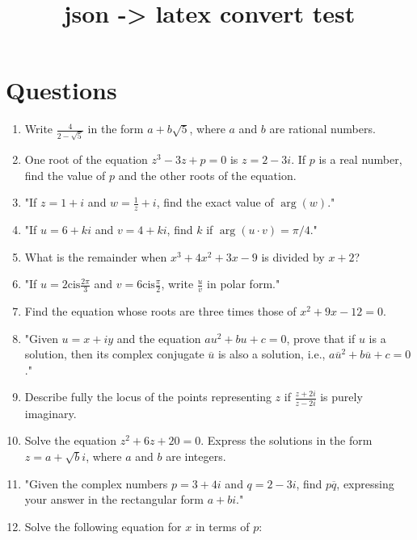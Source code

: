 \documentclass{article}
\begin{document}
\title{json -> latex convert test}
\author{}
\date{}
\maketitle
\section*{Questions}
\begin{enumerate}
\item Write \(\frac{4}{2 - \sqrt{5}}\) in the form \(a + b\sqrt{5}\), where \(a\) and \(b\) are rational numbers.
\vspace{3cm}
\item One root of the equation \( z^3 - 3z + p = 0 \) is \( z = 2 - 3i \). If \( p \) is a real number, find the value of \( p \) and the other roots of the equation.
\vspace{3cm}
\item "If \( z = 1 + i \) and \( w = \frac{1}{z} + i \), find the exact value of \(\arg(w)\)."
\vspace{3cm}
\item "If \( u = 6 + ki \) and \( v = 4 + ki \), find \( k \) if \(\arg(u \cdot v) = \pi/4\)."
\vspace{3cm}
\item What is the remainder when \( x^3 + 4x^2 + 3x - 9 \) is divided by \( x + 2 \)?
\vspace{3cm}
\item "If \( u = 2 \text{cis} \frac{2\pi}{3} \) and \( v = 6 \text{cis} \frac{\pi}{2} \), write \( \frac{u}{v} \) in polar form."
\vspace{3cm}
\item Find the equation whose roots are three times those of \( x^2 + 9x - 12 = 0 \).
\vspace{3cm}
\item "Given \( u = x + iy \) and the equation \( au^2 + bu + c = 0 \), prove that if \( u \) is a solution, then its complex conjugate \( \overline{u} \) is also a solution, i.e., \( a\overline{u}^2 + b\overline{u} + c = 0 \)."
\vspace{3cm}
\item Describe fully the locus of the points representing \( z \) if \(\frac{z + 2i}{z - 2i}\) is purely imaginary.
\vspace{3cm}
\item Solve the equation \( z^2 + 6z + 20 = 0 \). Express the solutions in the form \( z = a + \sqrt{b}i \), where \( a \) and \( b \) are integers.
\vspace{3cm}
\item "Given the complex numbers \( p = 3 + 4i \) and \( q = 2 - 3i \), find \( p\overline{q} \), expressing your answer in the rectangular form \( a + bi \)."
\vspace{3cm}
\item Solve the following equation for \( x \) in terms of \( p \):


\end{enumerate}
\end{document}
